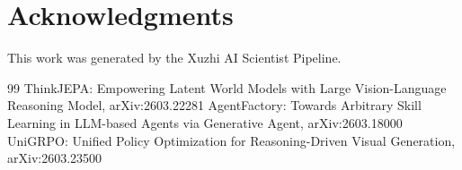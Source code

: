 \documentclass[11pt,a4paper]{article}
\begin{document}
\section*{Acknowledgments}
This work was generated by the Xuzhi AI Scientist Pipeline.

\begin{thebibliography}{99}
 ThinkJEPA: Empowering Latent World Models with Large Vision-Language Reasoning Model, arXiv:2603.22281
 AgentFactory: Towards Arbitrary Skill Learning in LLM-based Agents via Generative Agent, arXiv:2603.18000
 UniGRPO: Unified Policy Optimization for Reasoning-Driven Visual Generation, arXiv:2603.23500
\end{thebibliography}
\end{document}
